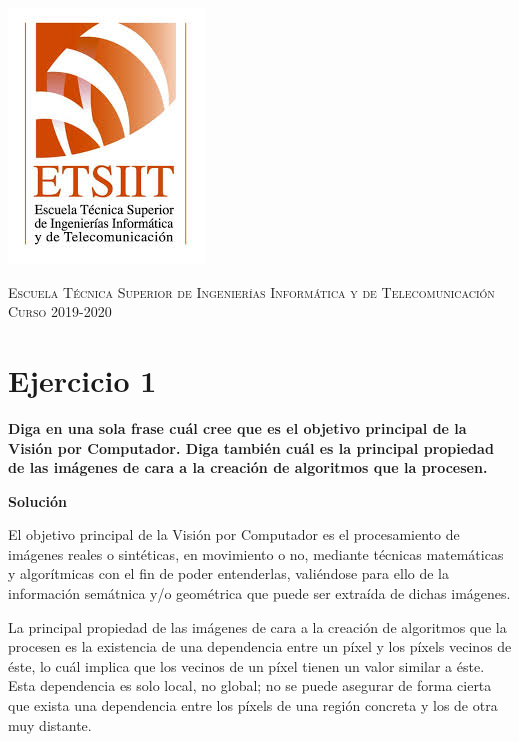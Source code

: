 \documentclass[11pt,a4paper]{article}
\newcommand{\answer}{\noindent\textbf{Solución}}
\newcommand{\question}[1]{\noindent\textbf{#1}}
\newcommand{\nonumbersection}[1]{\section*{#1}\addcontentsline{toc}{section}{#1}}
\begin{document}
\begin{titlepage}
\begin{minipage}{\textwidth}
\includegraphics[scale=0.3]{img/etsiit.jpeg}

\vspace{0.7cm}
\textsc{Escuela Técnica Superior de Ingenierías Informática y de Telecomunicación}\\
\vspace{1cm}
\textsc{Curso 2019-2020}
\end{minipage}
\end{titlepage}

\tableofcontents
\thispagestyle{empty}				%

\newpage

\setlength{\parskip}{1em}

\nonumbersection{Ejercicio 1}

\question{Diga en una sola frase cuál cree que es el objetivo principal de la Visión por Computador. Diga también cuál es la
principal propiedad de las imágenes de cara a la creación de algoritmos que la procesen.}

\answer

El objetivo principal de la Visión por Computador es el procesamiento de imágenes reales o sintéticas, en movimiento
o no, mediante técnicas matemáticas y algorítmicas con el fin de poder entenderlas, valiéndose para ello de la información
semátnica y/o geométrica que puede ser extraída de dichas imágenes.

La principal propiedad de las imágenes de cara a la creación de algoritmos que la procesen es la existencia de una dependencia
entre un píxel y los píxels vecinos de éste, lo cuál implica que los vecinos de un píxel tienen un valor similar a éste. Esta
dependencia es solo local, no global; no se puede asegurar de forma cierta que exista una dependencia entre los píxels de una
región concreta y los de otra muy distante.
\end{document}
